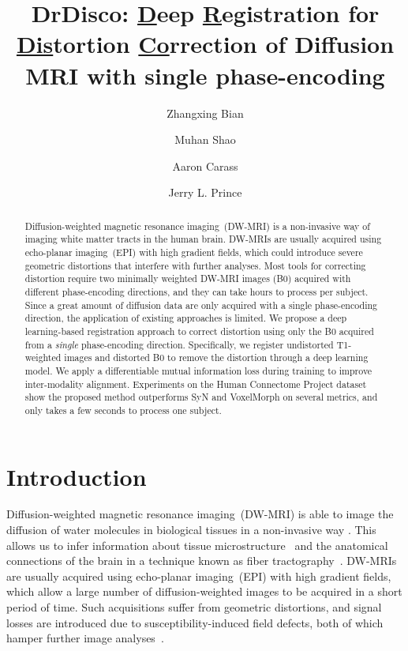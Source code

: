 \documentclass[]{spie}  %
\title{DrDisco: \underline{D}eep \underline{R}egistration for \underline{Dis}tortion \underline{Co}rrection of Diffusion MRI with single phase-encoding}
\author[a]{Zhangxing Bian}
\author[a]{Muhan Shao}
\author[a]{Aaron Carass}
\author[a]{Jerry L. Prince}
\affil[a]{Department of Electrical and Computer Engineering, Johns~Hopkins~University,~Baltimore,~MD~21218,~USA}
\begin{document}
 
\maketitle

\begin{abstract}

Diffusion-weighted magnetic resonance imaging~(DW-MRI) is a non-invasive way of imaging white matter tracts in the human brain. DW-MRIs are usually acquired using echo-planar imaging~(EPI) with high gradient fields, which could introduce severe geometric distortions that interfere with further analyses. Most tools for correcting distortion require two minimally weighted DW-MRI images (B0) acquired with different phase-encoding directions, and they can take hours to process per subject. Since a great amount of diffusion data are only acquired with a single phase-encoding direction, the application of existing approaches is limited. We propose a deep learning-based registration approach to correct distortion using only the B0 acquired from a \textit{single} phase-encoding direction. Specifically, we register undistorted T1-weighted images and distorted B0 to remove the distortion through a deep learning model. We apply a differentiable mutual information loss during training to improve inter-modality alignment. Experiments on the Human Connectome Project dataset show the proposed method outperforms SyN and VoxelMorph on several metrics, and only takes a few seconds to process one subject. 


\end{abstract}


\section{Introduction}


Diffusion-weighted magnetic resonance imaging~(DW-MRI) is able to image the diffusion of water molecules in biological tissues in a non-invasive way \cite{le1986mrShort,taylor1985spatial}. This allows us to infer information about tissue microstructure~\cite{novikov2019quantifying} and the anatomical connections of the brain in a technique known as fiber tractography~\cite{mori2002fiber, mori1999three, xue1999vivo, bian2023spieB}. 
DW-MRIs are usually acquired using echo-planar imaging~(EPI)\cite{ordidge1999development} with high gradient fields, which allow a large number of diffusion-weighted images to be acquired in a short period of time. Such acquisitions suffer from geometric distortions, and signal losses are introduced due to susceptibility-induced field defects, both of which hamper further image analyses~\cite{wu2008comparisonShort}.
\end{document}
